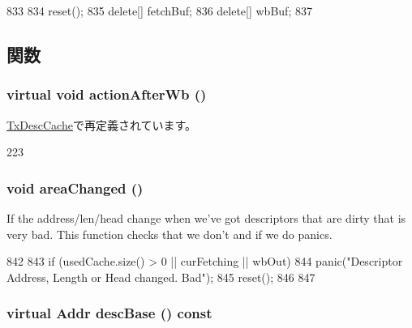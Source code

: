 \begin{DoxyCode}
833 {
834     reset();
835     delete[] fetchBuf;
836     delete[] wbBuf;
837 }
\end{DoxyCode}


\subsection{関数}
\hypertarget{classIGbE_1_1DescCache_a22d736f39e553f2f93799dc2e0eea912}{
\subsubsection[{actionAfterWb}]{\setlength{\rightskip}{0pt plus 5cm}virtual void actionAfterWb ()}}
\label{classIGbE_1_1DescCache_a22d736f39e553f2f93799dc2e0eea912}


\hyperlink{classIGbE_1_1TxDescCache_a32bbafeff677d291df2eb9247a33b292}{TxDescCache}で再定義されています。


\begin{DoxyCode}
223 {}
\end{DoxyCode}
\hypertarget{classIGbE_1_1DescCache_aa55a03ef5e0e85dfa7860656c57c649a}{
\subsubsection[{areaChanged}]{\setlength{\rightskip}{0pt plus 5cm}void areaChanged ()}}
\label{classIGbE_1_1DescCache_aa55a03ef5e0e85dfa7860656c57c649a}
If the address/len/head change when we've got descriptors that are dirty that is very bad. This function checks that we don't and if we do panics. 


\begin{DoxyCode}
842 {
843     if (usedCache.size() > 0 || curFetching || wbOut)
844         panic("Descriptor Address, Length or Head changed. Bad\n");
845     reset();
846 
847 }
\end{DoxyCode}
\hypertarget{classIGbE_1_1DescCache_aa8bdc83aee2be5e0eaa7a1f7f1f284e2}{
\subsubsection[{descBase}]{\setlength{\rightskip}{0pt plus 5cm}virtual {\bf Addr} descBase () const}}
\label{classIGbE_1_1DescCache_aa8bdc83aee2be5e0eaa7a1f7f1f284e2}


